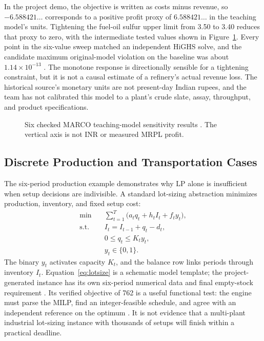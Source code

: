\documentclass[10pt,a4paper,twocolumn]{article}
\begin{document}
In the project demo, the objective is written as costs minus revenue, so $-6.588421\ldots$ corresponds to a positive profit proxy of $6.588421\ldots$ in the teaching model's units. Tightening the fuel-oil sulfur upper limit from 3.50 to 3.40 reduces that proxy to zero, with the intermediate tested values shown in Figure~\ref{fig:sulfur}. Every point in the six-value sweep matched an independent HiGHS solve, and the candidate maximum original-model violation on the baseline was about $1.14\times10^{-13}$ \cite{demo}. The monotone response is directionally sensible for a tightening constraint, but it is not a causal estimate of a refinery's actual revenue loss. The historical source's monetary units are not present-day Indian rupees, and the team has not calibrated this model to a plant's crude slate, assay, throughput, and product specifications.

\begin{figure}[t]
\centering
{}
\caption{Six checked MARCO teaching-model sensitivity results \cite{demo}. The vertical axis is not INR or measured MRPL profit.}
\label{fig:sulfur}
\end{figure}

\subsection{Discrete Production and Transportation Cases}

The six-period production example demonstrates why LP alone is insufficient when setup decisions are indivisible. A standard lot-sizing abstraction minimizes production, inventory, and fixed setup cost:
\begin{align}
\min\quad & \sum_{t=1}^{T}\bigl(a_tq_t+h_tI_t+f_ty_t\bigr),\\
\text{s.t.}\quad & I_t=I_{t-1}+q_t-d_t,\\
& 0\leq q_t\leq K_ty_t,\\
& y_t\in\{0,1\}.
\label{eq:lotsize}
\end{align}
The binary $y_t$ activates capacity $K_t$, and the balance row links periods through inventory $I_t$. Equation~\eqref{eq:lotsize} is a schematic model template; the project-generated instance has its own six-period numerical data and final empty-stock requirement \cite{industrial}. Its verified objective of 762 is a useful functional test: the engine must parse the MILP, find an integer-feasible schedule, and agree with an independent reference on the optimum \cite{demo}. It is not evidence that a multi-plant industrial lot-sizing instance with thousands of setups will finish within a practical deadline.
\end{document}
